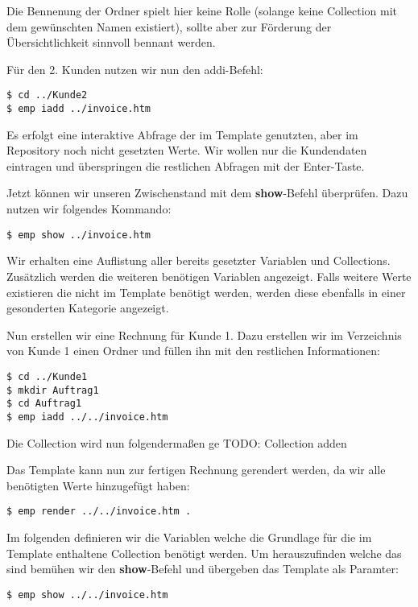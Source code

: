 Die Bennenung der Ordner spielt hier keine Rolle (solange keine Collection mit dem gewünschten Namen existiert), sollte aber zur Förderung der Übersichtlichkeit sinnvoll bennant werden.

Für den 2. Kunden nutzen wir nun den addi-Befehl:
\begin{lstlisting}[style=Bash]
$ cd ../Kunde2
$ emp iadd ../invoice.htm
\end{lstlisting}

Es erfolgt eine interaktive Abfrage der im Template genutzten, aber im Repository noch nicht gesetzten Werte. Wir wollen nur die Kundendaten eintragen und überspringen die restlichen Abfragen mit der Enter-Taste.

Jetzt können wir unseren Zwischenstand mit dem \textbf{show}-Befehl überprüfen. Dazu nutzen wir folgendes Kommando:
\begin{lstlisting}[style=Bash]
$ emp show ../invoice.htm
\end{lstlisting}

Wir erhalten eine Auflistung aller bereits gesetzter Variablen und Collections. Zusätzlich werden die weiteren benötigen Variablen angezeigt. Falls weitere Werte existieren die nicht im Template benötigt werden, werden diese ebenfalls in einer gesonderten Kategorie angezeigt.

Nun erstellen wir eine Rechnung für Kunde 1. Dazu erstellen wir im Verzeichnis von Kunde 1 einen Ordner und füllen ihn mit den restlichen Informationen:

\begin{lstlisting}[style=Bash]
$ cd ../Kunde1
$ mkdir Auftrag1
$ cd Auftrag1
$ emp iadd ../../invoice.htm
\end{lstlisting}

Die Collection wird nun folgendermaßen ge
TODO: Collection adden

Das Template kann nun zur fertigen Rechnung gerendert werden, da wir alle benötigten Werte hinzugefügt haben:
\begin{lstlisting}[style=Bash]
$ emp render ../../invoice.htm .
\end{lstlisting}

Im folgenden definieren wir die Variablen welche die Grundlage für die im Template enthaltene Collection benötigt werden. Um herauszufinden welche das sind bemühen wir den \textbf{show}-Befehl und übergeben das Template als Paramter:
\begin{lstlisting}[style=Bash]
$ emp show ../../invoice.htm
\end{lstlisting}

